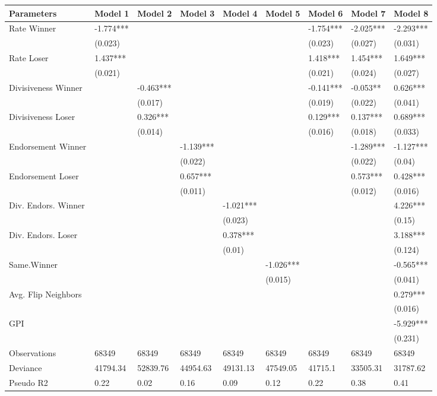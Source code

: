 
\begin{tabu} to 
\hline
Parameters & Model 1 & Model 2 & Model 3 & Model 4 & Model 5 & Model 6 & Model 7 & Model 8\\
\hline
Rate Winner & -1.774*** &  &  &  &  & -1.754*** & -2.025*** & -2.293***\\
\hline
 & (0.023) &  &  &  &  & (0.023) & (0.027) & (0.031)\\
\hline
Rate Loser & 1.437*** &  &  &  &  & 1.418*** & 1.454*** & 1.649***\\
\hline
 & (0.021) &  &  &  &  & (0.021) & (0.024) & (0.027)\\
\hline
Divisiveness Winner &  & -0.463*** &  &  &  & -0.141*** & -0.053** & 0.626***\\
\hline
 &  & (0.017) &  &  &  & (0.019) & (0.022) & (0.041)\\
\hline
Divisiveness Loser &  & 0.326*** &  &  &  & 0.129*** & 0.137*** & 0.689***\\
\hline
 &  & (0.014) &  &  &  & (0.016) & (0.018) & (0.033)\\
\hline
Endorsement Winner &  &  & -1.139*** &  &  &  & -1.289*** & -1.127***\\
\hline
 &  &  & (0.022) &  &  &  & (0.022) & (0.04)\\
\hline
Endorsement Loser &  &  & 0.657*** &  &  &  & 0.573*** & 0.428***\\
\hline
 &  &  & (0.011) &  &  &  & (0.012) & (0.016)\\
\hline
Div. Endors. Winner &  &  &  & -1.021*** &  &  &  & 4.226***\\
\hline
 &  &  &  & (0.023) &  &  &  & (0.15)\\
\hline
Div. Endors. Loser &  &  &  & 0.378*** &  &  &  & 3.188***\\
\hline
 &  &  &  & (0.01) &  &  &  & (0.124)\\
\hline
Same.Winner &  &  &  &  & -1.026*** &  &  & -0.565***\\
\hline
 &  &  &  &  & (0.015) &  &  & (0.041)\\
\hline
Avg. Flip Neighbors &  &  &  &  &  &  &  & 0.279***\\
\hline
 &  &  &  &  &  &  &  & (0.016)\\
\hline
GPI &  &  &  &  &  &  &  & -5.929***\\
\hline
 &  &  &  &  &  &  &  & (0.231)\\
\hline
Observations & 68349 & 68349 & 68349 & 68349 & 68349 & 68349 & 68349 & 68349\\
\hline
Deviance & 41794.34 & 52839.76 & 44954.63 & 49131.13 & 47549.05 & 41715.1 & 33505.31 & 31787.62\\
\hline
Pseudo R2 & 0.22 & 0.02 & 0.16 & 0.09 & 0.12 & 0.22 & 0.38 & 0.41\\
\hline
\end{tabu}
